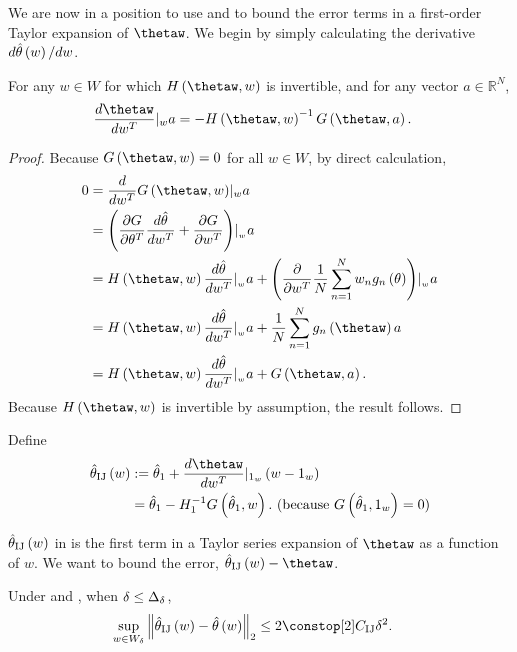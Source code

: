 We are now in a position to use \paperallcoreassum and 
to bound the error terms in a first-order Taylor expansion of $\thetaw$.
We begin by simply calculating the derivative $d\hat{\theta}\left(w\right)/dw$.
\begin{prop}
\label{propref:theta_w_first_derivative}For any $w\in W$ for which
$H\left(\thetaw,w\right)$ is invertible, and for any vector $a\in\mathbb{R}^{N}$,
\begin{align*}
\frac{d\thetaw}{dw^{T}}\at wa & =-H\left(\thetaw,w\right)^{-1}G\left(\thetaw,a\right).
\end{align*}
\end{prop}
\begin{proof}
Because $G\left(\thetaw,w\right)=0$ for all $w\in W$, by direct
calculation,
\begin{align*}
0 & =\frac{d}{dw^{T}}G\left(\thetaw,w\right)\at wa\\
 & =\left(\frac{\partial G}{\partial\theta^{T}}\frac{d\hat{\theta}}{dw^{T}}+\frac{\partial G}{\partial w^{T}}\right)\at{_{w}}a\\
 & =H\left(\thetaw,w\right)\frac{d\hat{\theta}}{dw^{T}}\at{_{w}}a+\left(\frac{\partial}{\partial w^{T}}\frac{1}{N}\sum_{n=1}^{N}w_{n}g_{n}\left(\theta\right)\right)\at{_{w}}a\\
 & =H\left(\thetaw,w\right)\frac{d\hat{\theta}}{dw^{T}}\at{_{w}}a+\frac{1}{N}\sum_{n=1}^{N}g_{n}\left(\thetaw\right)a\\
 & =H\left(\thetaw,w\right)\frac{d\hat{\theta}}{dw^{T}}\at{_{w}}a+G\left(\thetaw,a\right).
\end{align*}
Because $H\left(\thetaw,w\right)$ is invertible by assumption, the
result follows.
\end{proof}
\begin{defn}
\label{defref:theta_infinitesimal_jackknife}Define
\begin{align*}
\thetaij\left(w\right) & :=\thetaone+\frac{d\thetaw}{dw^{T}}\at{\onevec}\left(w-\onevec\right)\\
 & =\thetaone-\hone^{-1}G\left(\thetaone,w\right).\textrm{ (because }G\left(\thetaone,\onevec\right)=0\textrm{)}
\end{align*}
\end{defn}
%
$\hat{\theta}_{\textrm{IJ}}\left(w\right)$ in 
is the first term in a Taylor series expansion of $\thetaw$ as a
function of $w$. We want to bound the error, $\thetaij\left(w\right)-\thetaw$.
\begin{thm}
\label{thmref:taylor_error_first}Under \paperallcoreassum and ,
when $\delta\le\Delta_{\delta}$,
\begin{align*}
\sup_{w\in W_{\delta}}\norm{\thetaij\left(w\right)-\thetahat\left(w\right)}_{2} & \le2\constop[2]\constij\delta^{2}.
\end{align*}
\end{thm}
